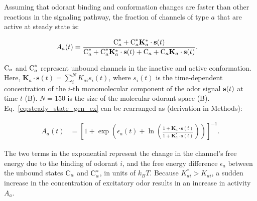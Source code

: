 \documentclass[9pt,lineno]{elife}
\begin{document}
Assuming that odorant binding and conformation changes are faster than other reactions in the signaling pathway, the fraction of channels of type $a$ that are active at steady state is: {\color{blue} 


\begin{align}
A_a(t) &= \frac{\textup{C}_a^* + \textup{C}_a^* \mathbf{K}^*_a\cdot\mathbf{s}(t)}{\textup{C}_a^* +\textup{C}_a^* \mathbf{K}^*_a\cdot\mathbf{s}(t) + \textup{C}_a +\textup{C}_a \mathbf{K}_a\cdot\mathbf{s}(t) }. 
\label{eq:steady_state_gen_ex}
\end{align}

$\textup{C}_a$ and $\textup{C}_a^*$ represent unbound channels in the inactive and active conformation. Here, $\mathbf{K}_a\cdot\mathbf{s}(t)=\sum_i^N K_{ai} s_i(t)$, where $s_i(t)$ is the time-dependent concentration of the $i$-th monomolecular component of the odor signal ${\bf s}(t)$ at time $t$ (B).  $N=150$ is the size of the molecular odorant space (B).
Eq.~\ref{eq:steady_state_gen_ex} can be rearranged as (derivation in Methods):

\begin{align}
A_a(t) &= \left[1 + \exp\left(\epsilon_a(t) + \ln\left(\frac{1 + \mathbf{K}_a\cdot\mathbf{s}(t)}{1 + \mathbf{K}^*_a\cdot\mathbf{s}(t)}\right)\right)\right]^{-1}. 
\label{eq:steady_state_act_OR}
\end{align}

The two terms in the exponential represent the change in the channel's free energy due to the binding of odorant $i$, and the free energy difference %
$\epsilon_a$ between the unbound states $\textup{C}_a$ and $\textup{C}_a^*$, %
in units of $k_B T$. Because $K^*_{ai} > K_{ai}$, a sudden increase in the concentration of excitatory odor results in an %
increase in activity $A_a$.

}
\end{document}
